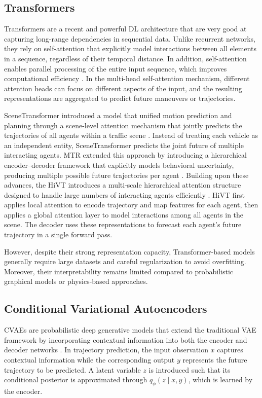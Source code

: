\subsection{Transformers}
Transformers are a recent and powerful \ac{DL} architecture that are very good at capturing
long-range dependencies in sequential data. Unlike recurrent networks, they rely on self-attention
that explicitly model interactions between all elements in a sequence, regardless of their
temporal distance. In addition, self-attention enables parallel processing of the entire input sequence,
which improves computational efficiency \cite{vaswaniattention,winland_self_attention_ibm}. In the
multi-head self-attention mechanism, different attention heads can focus on different aspects of the input,
and the resulting representations are aggregated to predict future maneuvers or trajectories.

\par SceneTransformer introduced a model that unified motion prediction and planning through a scene-level
attention mechanism that jointly predicts the trajectories of all agents within a traffic scene \cite{ngiam2022scenetransformerunifiedarchitecture}. Instead
of treating each vehicle as an independent entity, SceneTransformer predicts the joint future of multiple
interacting agents. \ac{MTR} extended this approach by introducing a hierarchical
encoder–decoder framework that explicitly models behavioral uncertainty, producing multiple possible
future trajectories per agent \cite{shi2023motiontransformerglobalintention}. Building upon these advances, the \ac{HiVT} 
introduces a multi-scale hierarchical attention structure designed to handle large numbers of
interacting agents efficiently \cite{inproceedingshivt}. \ac{HiVT} first applies local attention to encode trajectory and map features
for each agent, then applies a global attention layer to model interactions among all agents in the scene.
The decoder uses these representations to forecast each agent's future trajectory in a single forward
pass.

\par However, despite their strong representation capacity, Transformer-based models generally require large datasets and careful
regularization to avoid overfitting. Moreover, their interpretability remains limited compared to probabilistic
graphical models or physics-based approaches.

\subsection{Conditional Variational Autoencoders}
\acp{CVAE} are probabilistic deep generative models that extend the
traditional \ac{VAE} framework by incorporating contextual information
into both the encoder and decoder networks \cite{NIPS2015_8d55a249}. In trajectory prediction, the input observation \(x\) captures
contextual information while the corresponding output \(y\) represents the future trajectory to be predicted.
A latent variable \(z\) is introduced such that its conditional posterior is approximated through
\(q_{\phi}(z \mid x, y)\), which is learned by the encoder.

